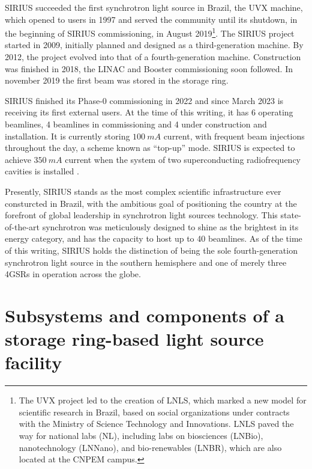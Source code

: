 SIRIUS succeeded the first synchrotron light source in Brazil, the UVX machine, which opened to users in 1997 and served the community until its shutdown, in the beginning of SIRIUS commissioning, in August 2019\footnote{The UVX project led to the creation of LNLS, which marked a new model for scientific research in Brazil, based on social organizations under contracts with the Ministry of Science Technology and Innovations. LNLS paved the way for national labs (NL), including labs on biosciences (LNBio), nanotechnology (LNNano), and bio-renewables (LNBR), which are also located at the CNPEM campus.}\cite{liu_synchrotron_2019}. The SIRIUS project started in 2009, initially planned and designed as a third-generation machine. By 2012, the project evolved into that of a fourth-generation machine\cite{liu_synchrotron_2019}. Construction was finished in 2018, the LINAC and Booster commissioning soon followed. In november 2019 the first beam was stored in the storage ring.

SIRIUS finished its Phase-0 commissioning in 2022 and since March 2023 is receiving its first external users. At the time of this writing,  it has 6 operating beamlines, 4 beamlines in commissioning and 4 under construction and installation. It is currently storing $100~\unit{mA}$ current, with frequent beam injections throughout the day, a scheme known as ``top-up'' mode. SIRIUS is expected to achieve $350~\unit{mA}$ current when the system of two superconducting radiofrequency cavities is installed \cite{liu_status_2022,liu_status_2023}.

Presently, SIRIUS stands as the most complex scientific infrastructure ever consturcted in Brazil, with the ambitious goal of positioning the country at the forefront of global leadership in synchrotron light sources technology. This state-of-the-art synchrotron was meticulously designed to shine as the brightest in its energy category, and has the capacity to host up to 40 beamlines. As of the time of this writing, SIRIUS holds the distinction of being the sole fourth-generation synchrotron light source in the southern hemisphere and one of merely three 4GSRs in operation across the globe.

\section{Subsystems and components of a storage ring-based light source facility}

